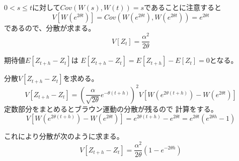\documentclass[12pt,b5paper]{ltjsarticle}
\begin{document}
\begin{enumerate}
      $0<s\leq t$に対して$Cov(W(s),W(t))=s$であることに注意すると
      \begin{equation}
       V\left[ W(e^{2\theta t}) \right]
        = Cov\left( W(e^{2\theta t}), W(e^{2\theta t}) \right)
        = e^{2\theta t}
      \end{equation}
      であるので、分散が求まる。
      \begin{equation}
       V[Z_{t}]=\frac{\alpha^2}{2\theta}
      \end{equation}



      期待値$E[Z_{t+h}-Z_{t}]$は
      $E[Z_{t+h}-Z_{t}]=E[Z_{t+h}]-E[Z_{t}]=0$となる。

      分散$V[Z_{t+h}-Z_{t}]$を求める。
      \begin{equation}
       V[Z_{t+h}-Z_{t}]=
        \left( \frac{\alpha}{\sqrt{2\theta}}e^{-\theta (t+h)} \right)^2
        V[W(e^{2\theta (t+h)})-W(e^{2\theta t})]
      \end{equation}
      定数部分をまとめるとブラウン運動の分散が残るので
      計算をする。
      \begin{equation}
       V[W(e^{2\theta (t+h)})-W(e^{2\theta t})]
        = e^{2\theta (t+h)} - e^{2\theta t}
        = e^{2\theta t}(e^{2\theta h} -1)
      \end{equation}

      これにより分散が次のように求まる。
      \begin{equation}
       V[Z_{t+h}-Z_{t}]=
        \frac{\alpha^2}{2\theta} (1-e^{-2\theta h})
      \end{equation}





\end{enumerate}
\end{document}
